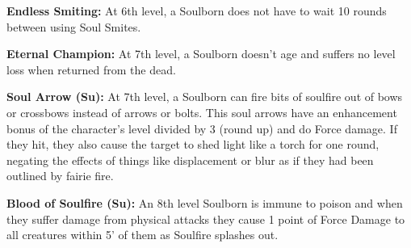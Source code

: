 \textbf{Endless Smiting:} At 6th level, a Soulborn does not have to wait 10 rounds between using Soul Smites. 

\textbf{Eternal Champion:} At 7th level, a Soulborn doesn't age and suffers no level loss when returned from the dead. 

\textbf{Soul Arrow (Su):} At 7th level, a Soulborn can fire bits of soulfire out of bows or crossbows instead of arrows or bolts. This soul arrows have an enhancement bonus of the character's level divided by 3 (round up) and do Force damage. If they hit, they also cause the target to shed light like a torch for one round, negating the effects of things like displacement or blur as if they had been outlined by fairie fire. 

\textbf{Blood of Soulfire (Su):} An 8th level Soulborn is immune to poison and when they suffer damage from physical attacks they cause 1 point of Force Damage to all creatures within 5' of them as Soulfire splashes out. 

